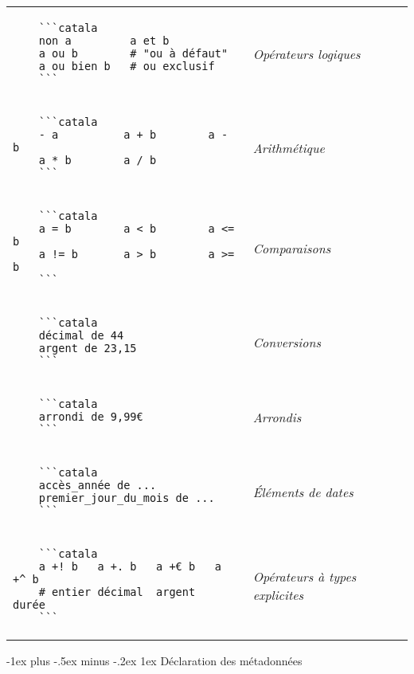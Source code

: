 \documentclass{article}
\makeatletter
\newcommand\articlenormalsize{\fontsize{10pt}{12pt}\selectfont}
\renewcommand{\section}{\@startsection{section}{1}{0mm}%
                                {-1ex plus -.5ex minus -.2ex}%
                                {1ex}%
                                {\normalfont\articlenormalsize\bfseries}}
\newenvironment{catala}{%
  \VerbatimEnvironment
  \let\FV@ListVSpace\relax
  \begin{verbatim}}%
 {\end{verbatim}}
\makeatother
\begin{document}
\begin{multicols}{3}
\begin{tabular}{@{}p{\cola}>{\slshape}p{\colb}@{}}
  \begin{catala}
    ```catala
    non a         a et b
    a ou b        # "ou à défaut"
    a ou bien b   # ou exclusif
    ```
  \end{catala}
  & Opérateurs logiques
  \\
  \begin{catala}
    ```catala
    - a          a + b        a - b
    a * b        a / b
    ```
  \end{catala}
  & Arithmétique
  \\
  \begin{catala}
    ```catala
    a = b        a < b        a <= b
    a != b       a > b        a >= b
    ```
  \end{catala}
  & Comparaisons
  \\
  \begin{catala}
    ```catala
    décimal de 44
    argent de 23,15
    ```
  \end{catala}
  & Conversions
  \\
  \begin{catala}
    ```catala
    arrondi de 9,99€
    ```
  \end{catala}
  & Arrondis
  \\
  \begin{catala}
    ```catala
    accès_année de ...
    premier_jour_du_mois de ...
    ```
  \end{catala}
  & Éléments de dates
  \\
  \begin{catala}
    ```catala
    a +! b   a +. b   a +€ b   a +^ b
    # entier décimal  argent   durée
    ```
  \end{catala}
  & Opérateurs à types explicites
  \\
\end{tabular}

\section{Déclaration des métadonnées}

\begin{tabular}{@{}p{\cola}>{\slshape}p{\colb}@{}}



\end{tabular}
\end{multicols}
\end{document}
